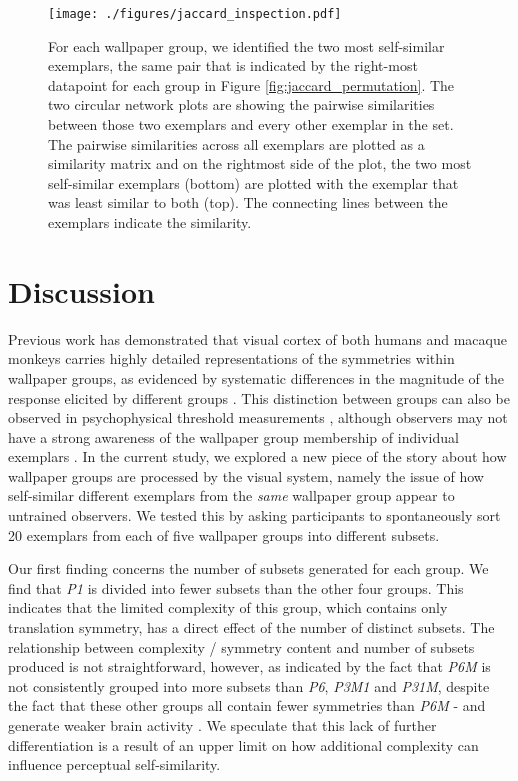 \documentclass[11pt, twoside]{article}
\begin{document}
\begin{figure}[hbt!]
	\centering
	\texttt{[image: ./figures/jaccard\_inspection.pdf]}
	\caption{For each wallpaper group, we identified the two most self-similar exemplars, the same pair that is indicated by the right-most datapoint for each group in Figure \ref{fig:jaccard_permutation}. The two circular network plots are showing the pairwise similarities between those two exemplars and every other exemplar in the set. The pairwise similarities across all exemplars are plotted as a similarity matrix and on the rightmost side of the plot, the two most self-similar exemplars (bottom) are plotted with the exemplar that was least similar to both (top). The connecting lines between the exemplars indicate the similarity.}
	\label{fig:jaccard_inspection}
\end{figure}

\section*{Discussion}
Previous work has demonstrated that visual cortex of both humans and macaque monkeys carries highly detailed representations of the symmetries within wallpaper groups, as evidenced by systematic differences in the magnitude of the response elicited by different groups \citep{RN1725,kohler_clarke_2021,audurier_symmetry_2021}. This distinction between groups can also be observed in psychophysical threshold measurements \citep{kohler_clarke_2021}, although observers may not have a strong awareness of the wallpaper group membership of individual exemplars \citep{RN172}. In the current study, we explored a new piece of the story about how wallpaper groups are processed by the visual system, namely the issue of how self-similar different exemplars from the \textit{same} wallpaper group appear to untrained observers. We tested this by asking participants to spontaneously sort 20 exemplars from each of five wallpaper groups into different subsets. 

Our first finding concerns the number of subsets generated for each group. We find that \textit{P1} is divided into fewer subsets than the other four groups. This indicates that the limited complexity of this group, which contains only translation symmetry, has a direct effect of the number of distinct subsets. The relationship between complexity / symmetry content and number of subsets produced is not straightforward, however, as indicated by the fact that \textit{P6M} is not consistently grouped into more subsets than \textit{P6}, \textit{P3M1} and \textit{P31M}, despite the fact that these other groups all contain fewer symmetries than \textit{P6M} - and generate weaker brain activity \citep{kohler_clarke_2021}. We speculate that this lack of further differentiation is a result of an upper limit on how additional complexity can influence perceptual self-similarity. 
\end{document}

